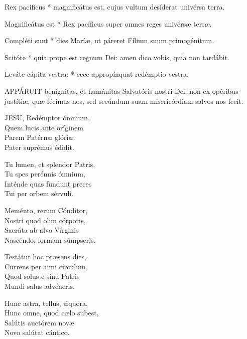 



 Rex pacíficus * magnificátus est, cujus vultum desíderat univérsa terra.


 Magnificátus est * Rex pacíficus super omnes reges univérsæ terræ.

 Compléti sunt * dies Maríæ, ut páreret Fílium suum primogénitum.

 Scitóte * quia prope est regnum Dei: amen dico vobis, quia non tardábit.

 Leváte cápita vestra: * ecce appropínquat redémptio vestra.


\lettrine[lines=2]{A}{PPÁRUIT} benígnitas, et humánitas Salvatóris nostri Dei: non ex opéribus justítiæ, quæ fécimus nos, sed secúndum suam misericórdiam salvos nos fecit.


\lettrine[lines=2]{J}{ESU}, Redémptor ómnium,\\
Quem lucis ante oríginem\\
Parem Patérnæ glóriæ\\
Pater suprémus édidit.

Tu lumen, et splendor Patris,\\
Tu spes perénnis ómnium,\\
Inténde quas fundunt preces\\
Tui per orbem sérvuli.

Meménto, rerum Cónditor,\\
Nostri quod olim córporis,\\
Sacráta ab alvo Vírginis\\
Nascéndo, formam súmpseris.

Testátur hoc præsens dies,\\
Currens per anni círculum,\\
Quod solus e sinu Patris\\
Mundi salus advéneris.

Hunc astra, tellus, ǽquora,\\
Hunc omne, quod cælo subest,\\
Salútis auctórem novæ\\
Novo salútat cántico.

